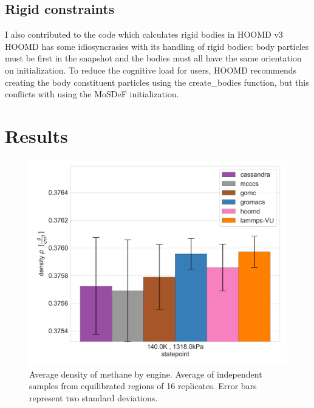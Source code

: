 \subsection{Rigid constraints}

I also contributed to the code which calculates rigid bodies in HOOMD v3 %
HOOMD has some idiosyncrasies with its handling of rigid bodies: body particles must be first in the snapshot and the bodies must all have the same orientation on initialization. To reduce the cognitive load for users, HOOMD recommends creating the body constituent particles using the create\_bodies function, but this conflicts with using the MoSDeF initialization.

\section{Results} 


\begin{figure}[h!]
    \centering
    \includegraphics[width=0.8\linewidth,keepaspectratio]{figures/rep_study/methaneUA_summary.png}
    \caption{Average density of methane by engine. Average of independent samples from equilibrated regions of 16 replicates. Error bars represent two standard deviations.}\label{fig:methane_density}
\end{figure}

